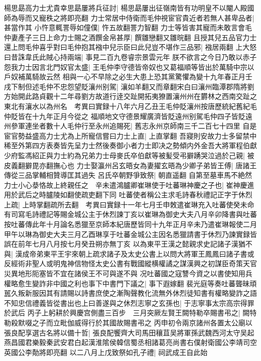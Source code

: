 楊思勗高力士尤貴幸思勗屢將兵征討|{
	楊思勗屢出征嶺南皆有功明皇不以閹人殿國師為辱而又寵秩之將即亮翻}
力士常居中侍衛而毛仲視宦官貴近者若無人甚卑品者|{
	甚當作其}
小忤意輒詈辱如僮僕|{
	忤五故翻詈力智翻}
力士等皆害其寵而未敢言會毛仲妻產子三日上命力士賜之酒饌金帛甚厚|{
	饌雛戀翻又雛晥翻}
且授其兒五品官力士還上問毛仲喜乎對曰毛仲抱其襁中兒示臣曰此兒豈不堪作三品邪|{
	襁居兩翻}
上大怒曰昔誅韋氏此賊心持兩端|{
	事見二百九卷睿宗景雲元年}
朕不欲言之今日乃敢以赤子怨我力士因言北門奴官太盛|{
	王毛仲李守德皆帝奴也又葛福順等皆出於萬騎中宗以戶奴補萬騎故云然}
相與一心不早除之必生大患上恐其黨驚懼為變十九年春正月壬戌下制但述毛仲不忠怨望貶瀼州别駕|{
	瀼如羊翻又而章翻宋白曰瀼州臨潭郡隋將劉方始開此路貞觀十二年尋劉方故道行逹交趾開拓夷獠置瀼州州在欝林之西南交趾之東北有瀼水以為州名　考異曰實録十八年六月乙丑王毛仲貶瀼州按唐歷統紀舊紀毛仲貶皆在十九年正月今從之}
福順地文守德景耀廣濟皆貶遠州别駕毛仲四子皆貶遠州參軍連坐者數十人毛仲行至永州追賜死|{
	舊志永州京師南三千二百七十四里}
自是宦官勢益盛高力士尤為上所寵信嘗曰力士上直|{
	上直掌翻}
吾寢則安故力士多留禁中稀至外第四方表奏皆先呈力士然後奏御小者力士即决之勢傾内外金吾大將軍程伯獻少府監馮紹正與力士約為兄弟力士母麥氏卒伯獻等被髪受弔擗踴哭泣過於己親|{
	被皮義翻擗毘亦翻撫心也}
力士娶瀛州呂玄晤女為妻擢玄晤為少卿子弟皆王傅|{
	唐諸王傳從三品掌輔相贊導匡其過失}
呂氏卒朝野爭致祭|{
	朝直遥翻}
自第至墓車馬不絶然力士小心㳟恪故上終親任之　辛未遣鴻臚卿崔琳使于吐蕃琳神慶之子也|{
	崔神慶進用於武后之時臚陵如翻使疏吏翻下同}
吐蕃使者稱公主求毛詩春秋禮記正字于休烈上疏|{
	上時掌翻疏所去翻　考異曰實録十一年七月壬申敇遣崔琳充入吐蕃使癸未命有司寫毛詩禮記等賜金城公主于休烈諫丁亥以崔琳為御史大夫八月辛卯降書與吐蕃按吐蕃傳此年十月論名悉獵至京師本紀唐歷皆同十九年正月辛未乃遣崔琳報使二月甲午以琳為御史大夫三月乙酉琳享于吐蕃金城公主因名悉獵請書于休烈乃諫實録皆誤在前年七月八月按七月癸丑朔亦無丁亥}
以為東平王漢之懿親求史記諸子漢猶不與|{
	漢成帝弟東平王宇來朝上疏求諸子及太史公書上以問大將軍王鳳鳳曰諸子書或反經術非聖人或明鬼神信物怪太史公書有戰國縱横權譎之謀漢興之初謀臣奇策天官災異地形阨塞皆不宜在諸侯王不可與遂不與}
况吐蕃國之寇讐今資之以書使知用兵權略愈生變詐非中國之利也事下中書門下議之|{
	事下遐嫁翻}
裴光庭等奏吐蕃聾昧頑嚚久叛新服因其有請賜以詩書庶使之漸陶聲教化流無外休烈徒知書有權略變詐之語不知忠信禮義皆從書出也上曰善遂與之休烈志寧之玄孫也|{
	于志寧事太宗高宗得罪於武后}
丙子上躬耕於興慶宫側盡三百步　三月突厥左賢王闕特勒卒賜書弔之|{
	闕特勒殺默啜之子而立毗伽威得行於其國故賜書弔之}
丙申初令兩京諸州各置太公廟以張良配享選古名將以備十哲|{
	張良配饗齊大司馬田穰苴吴將軍孫武魏西河太守吴起燕昌國君樂毅秦武安君白起漢淮隂侯韓信蜀丞相諸葛亮尚書右僕射衛國公李靖司空英國公李勣將即亮翻}
以二八月上戊致祭如孔子禮|{
	祠武成王自此始}


